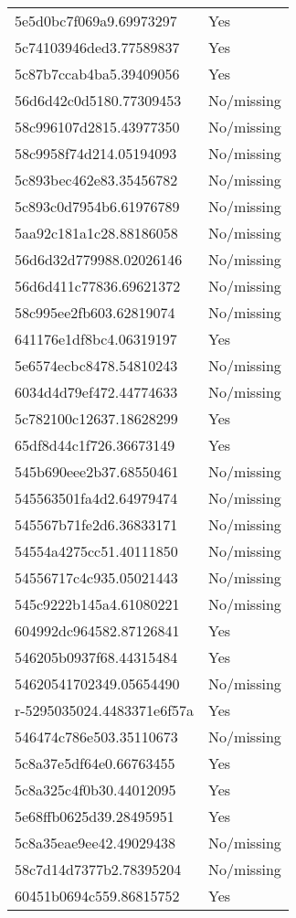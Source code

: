 \begin{tabular}{ll}
5e5d0bc7f069a9.69973297 & Yes \\
5c74103946ded3.77589837 & Yes \\
5c87b7ccab4ba5.39409056 & Yes \\
56d6d42c0d5180.77309453 & No/missing \\
58c996107d2815.43977350 & No/missing \\
58c9958f74d214.05194093 & No/missing \\
5c893bec462e83.35456782 & No/missing \\
5c893c0d7954b6.61976789 & No/missing \\
5aa92c181a1c28.88186058 & No/missing \\
56d6d32d779988.02026146 & No/missing \\
56d6d411c77836.69621372 & No/missing \\
58c995ee2fb603.62819074 & No/missing \\
641176e1df8bc4.06319197 & Yes \\
5e6574ecbc8478.54810243 & No/missing \\
6034d4d79ef472.44774633 & No/missing \\
5c782100c12637.18628299 & Yes \\
65df8d44c1f726.36673149 & Yes \\
545b690eee2b37.68550461 & No/missing \\
545563501fa4d2.64979474 & No/missing \\
545567b71fe2d6.36833171 & No/missing \\
54554a4275cc51.40111850 & No/missing \\
54556717c4c935.05021443 & No/missing \\
545c9222b145a4.61080221 & No/missing \\
604992dc964582.87126841 & Yes \\
546205b0937f68.44315484 & Yes \\
54620541702349.05654490 & No/missing \\
r-5295035024.4483371e6f57a & Yes \\
546474c786e503.35110673 & No/missing \\
5c8a37e5df64e0.66763455 & Yes \\
5c8a325c4f0b30.44012095 & Yes \\
5e68ffb0625d39.28495951 & Yes \\
5c8a35eae9ee42.49029438 & No/missing \\
58c7d14d7377b2.78395204 & No/missing \\
60451b0694c559.86815752 & Yes \\

\end{tabular}
